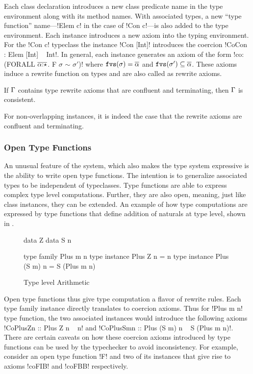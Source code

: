 \documentclass[manuscript,screen,nonacm]{acmart}
\begin{document}
Each class declaration introduces a new class predicate name in the type environment along with its method names. With associated types, a new ``type function'' name---!Elem c! in the case of !Con c!---is also added to the type environment.
Each instance introduces a new axiom into the typing environment. For the !Con c! typeclass the instance !Con [Int]! introduces the coercion !CoCon : Elem [Int] ~ Int!. In general, each instance generates an axiom of the form !co: (FORALL $\overline{\alpha{:}\star}$. F $\sigma$ $\sim$ $\sigma'$)! where $\texttt{fvs}(\sigma) = \overline{\alpha}$
and $\texttt{fvs}(\sigma') \subseteq \overline{\alpha}$. These axioms induce a rewrite function on types and are also called as rewrite axioms.

\begin{theorem}
If $\Gamma$ contains type rewrite axioms that are confluent and terminating, then $\Gamma$ is consistent.
\end{theorem}
For non-overlapping instances, it is indeed the case that the rewrite axioms are confluent and terminating.

\subsubsection{Open Type Functions}\label{sec:fc-encodes-opentypefun}
An unusual feature of the system, which also makes the type system expressive is the ability to write open type functions. The intention is to generalize associated types to be independent of typeclasses. Type functions are able to express complex type level computations. Further, they are also open, meaning, just like class instances, they can be extended. An example of how type computations are expressed by type functions that define addition of naturals at type level, shown in .
\begin{figure}[ht]
 \begin{minipage}[ht]{0.4\linewidth}
 \begin{code}
 data Z
 data S n
 \end{code}
 \end{minipage}%
 \begin{minipage}[ht]{0.4\linewidth}
 \begin{code}
 type family Plus m n
 type instance Plus Z n = n
 type instance Plus (S m) n = S (Plus m n)
 \end{code}
 \end{minipage}
 \caption{Type level Arithmetic}
 \label{fig:open-type-fun-add}
\end{figure}
Open type functions thus give type computation a flavor of rewrite rules. Each type family instance directly translates to coercion axioms. Thus for !Plus m n! type function, the two associated instances would introduce the following axioms !CoPlusZn :: Plus Z n ~ n! and !CoPlusSmn :: Plus (S m) n ~ S (Plus m n)!. There are certain caveats on how these coercion axioms introduced by type functions can be used by the typechecker to avoid inconsistency. For example, consider an open type function !F! and two of its instances that give rise to axioms !coFIB! and !coFBB! respectively.
\end{document}
